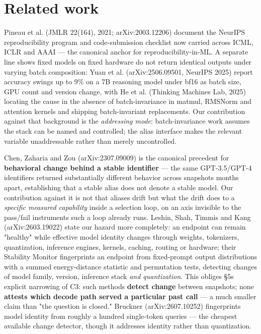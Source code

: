 \hypertarget{related-work}{%
\section{Related work}\label{related-work}}

Pineau et al. (JMLR 22(164), 2021; arXiv:2003.12206) document the NeurIPS reproducibility program and code-submission checklist now carried across ICML, ICLR and AAAI --- the canonical anchor for reproducibility-in-ML. A separate line shows fixed models on fixed hardware do not return identical outputs under varying batch composition: Yuan et al. (arXiv:2506.09501, NeurIPS 2025) report accuracy swings up to 9\% on a 7B reasoning model under bf16 as batch size, GPU count and version change, with He et al. (Thinking Machines Lab, 2025) locating the cause in the absence of batch-invariance in matmul, RMSNorm and attention kernels and shipping batch-invariant replacements. Our contribution against that background is the \emph{addressing mode}: batch-invariance work assumes the stack can be named and controlled; the alias interface makes the relevant variable unaddressable rather than merely uncontrolled.

Chen, Zaharia and Zou (arXiv:2307.09009) is the canonical precedent for \textbf{behavioral change behind a stable identifier} --- the same GPT-3.5/GPT-4 identifiers returned substantially different behavior across snapshots months apart, establishing that a stable alias does not denote a stable model. Our contribution against it is not that aliases drift but what the drift does to a \emph{specific measured capability} inside a selection loop, on an axis invisible to the pass/fail instruments such a loop already runs. Leshin, Shah, Timmis and Kang (arXiv:2603.19022) state our hazard more completely: an endpoint can remain "healthy" while effective model identity changes through weights, tokenizers, quantization, inference engines, kernels, caching, routing or hardware; their Stability Monitor fingerprints an endpoint from fixed-prompt output distributions with a summed energy-distance statistic and permutation tests, detecting changes of model family, version, inference stack \emph{and quantization}. This obliges §5\textquotesingle s explicit narrowing of C3: such methods \textbf{detect change} between snapshots; none \textbf{attests which decode path served a particular past call} --- a much smaller claim than "the question is closed." Bruckner (arXiv:2607.10252) fingerprints model identity from roughly a hundred single-token queries --- the cheapest available change detector, though it addresses identity rather than quantization.

